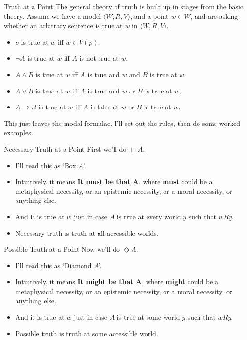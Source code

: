 \documentclass[
  14pt,
  letterpaper,
  ignorenonframetext,
  aspectratio=169,
  handout]{beamer}
\providecommand{\tightlist}{%
  \setlength{\itemsep}{0pt}\setlength{\parskip}{0pt}}\usepackage{longtable,booktabs,array}
\begin{document}
\begin{frame}{Truth at a Point}
\protect\hypertarget{truth-at-a-point}{}
The general theory of truth is built up in stages from the basic theory.
Assume we have a model \(\langle W, R, V\rangle\), and a point
\(w \in W\), and are asking whether an arbitrary sentence is true at
\(w\) in \(\langle W, R, V\rangle\).

\begin{itemize}[<+->]
\tightlist
\item
  \(p\) is true at \(w\) iff \(w \in V(p)\).
\item
  \(\neg A\) is true at \(w\) iff \(A\) is not true at \(w\).
\item
  \(A \wedge B\) is true at \(w\) iff \(A\) is true and \(w\) and \(B\)
  is true at \(w\).
\item
  \(A \vee B\) is true at \(w\) iff \(A\) is true and \(w\) or \(B\) is
  true at \(w\).
\item
  \(A \rightarrow B\) is true at \(w\) iff \(A\) is false at \(w\) or
  \(B\) is true at \(w\).
\end{itemize}

This just leaves the modal formulae. I'll set out the rules, then do
some worked examples.
\end{frame}

\begin{frame}{Necessary Truth at a Point}
\protect\hypertarget{necessary-truth-at-a-point}{}
First we'll do \(\Box A\).

\begin{itemize}[<+->]
\tightlist
\item
  I'll read this as `Box \(A\)'.
\item
  Intuitively, it means \textbf{It must be that A}, where \textbf{must}
  could be a metaphysical necessity, or an epistemic necessity, or a
  moral necessity, or anything else.
\item
  And it is true at \(w\) just in case \(A\) is true at every world
  \(y\) such that \(wRy\).
\item
  Necessary truth is truth at all accessible worlds.
\end{itemize}
\end{frame}

\begin{frame}{Possible Truth at a Point}
\protect\hypertarget{possible-truth-at-a-point}{}
Now we'll do \(\Diamond A\).

\begin{itemize}[<+->]
\tightlist
\item
  I'll read this as `Diamond \(A\)'.
\item
  Intuitively, it means \textbf{It might be that A}, where
  \textbf{might} could be a metaphysical necessity, or an epistemic
  necessity, or a moral necessity, or anything else.
\item
  And it is true at \(w\) just in case \(A\) is true at some world \(y\)
  such that \(wRy\).
\item
  Possible truth is truth at some accessible world.
\end{itemize}
\end{frame}
\end{document}
